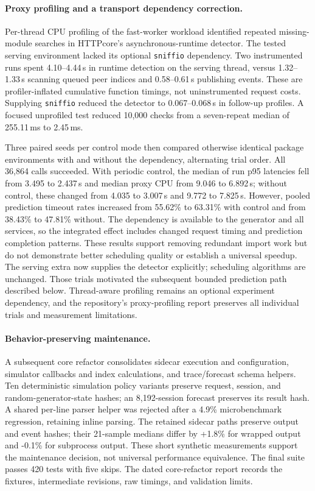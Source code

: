 \paragraph{Proxy profiling and a transport dependency correction.}
Per-thread CPU profiling of the fast-worker workload identified repeated
missing-module searches in HTTPcore's asynchronous-runtime detector.
The tested serving environment lacked its optional \texttt{sniffio} dependency.
Two instrumented runs spent 4.10--4.44\,s in runtime detection on the serving
thread, versus 1.32--1.33\,s scanning queued peer indices and 0.58--0.61\,s
publishing events. These are profiler-inflated cumulative function timings,
not uninstrumented request costs. Supplying \texttt{sniffio} reduced the detector
to 0.067--0.068\,s in follow-up profiles. A focused unprofiled test reduced
10,000 checks from a seven-repeat median of 255.11\,ms to 2.45\,ms.

Three paired seeds per control mode then compared otherwise identical package
environments with and without the dependency, alternating trial order.
All 36,864 calls succeeded. With periodic control, the median of run p95
latencies fell from 3.495 to 2.437\,s and median proxy CPU from 9.046 to
6.892\,s; without control, these changed from 4.035 to 3.007\,s and
9.772 to 7.825\,s. However, pooled prediction timeout rates increased from
55.62\% to 63.31\% with control and from 38.43\% to 47.81\% without.
The dependency is available to the generator and all services, so the integrated
effect includes changed request timing and prediction completion patterns.
These results support removing redundant import work but do not demonstrate
better scheduling quality or establish a universal speedup.
The serving extra now supplies the detector explicitly; scheduling algorithms
are unchanged. Those trials motivated the subsequent bounded prediction path described below.
Thread-aware profiling remains an optional experiment dependency, and the
repository's proxy-profiling report preserves all individual trials and
measurement limitations.

\paragraph{Behavior-preserving maintenance.}
A subsequent core refactor consolidates sidecar execution and configuration,
simulator callbacks and index calculations, and trace/forecast schema helpers.
Ten deterministic simulation policy variants preserve request, session, and
random-generator-state hashes; an 8,192-session forecast preserves its result
hash. A shared per-line parser helper was rejected after a 4.9\% microbenchmark
regression, retaining inline parsing. The retained sidecar paths preserve output
and event hashes; their 21-sample medians differ by +1.8\% for wrapped output and
-0.1\% for subprocess output. These short synthetic measurements support the
maintenance decision, not universal performance equivalence. The final suite
passes 420 tests with five skips. The dated core-refactor report records the
fixtures, intermediate revisions, raw timings, and validation limits.


